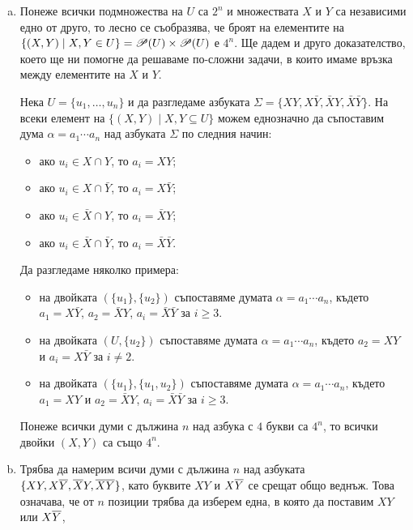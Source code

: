\begin{hint}
  \begin{enumerate}[a)]
  \item
    Понеже всички подмножества на $U$ са $2^n$ и множествата $X$ и $Y$ са независими едно от друго, то
    лесно се съобразява, че броят на елементите на $\{(X,Y) \mid X,Y \in U\} = \mathscr{P}(U) \times \mathscr{P}(U)$ е $4^n$.
    Ще дадем и друго доказателство, което ще ни помогне да решаваме по-сложни задачи, в които имаме връзка между 
    елементите на $X$ и $Y$.
    
    Нека $U = \{u_1,\dots,u_n\}$ и да разгледаме азбуката $\Sigma = \{XY, X\bar{Y}, \bar{X}Y, \bar{X}\bar{Y}\}$.
    На всеки елемент на  $\{(X,Y) \mid X,Y \subseteq U\}$ можем еднозначно да съпоставим 
    дума  $\alpha = a_1\cdots a_n$ над азбуката $\Sigma$
    по следния начин:
    \begin{itemize}
    \item 
      ако $u_i \in X \cap Y$, то $a_i = XY$;
    \item 
      ако $u_i \in X \cap \bar{Y}$, то $a_i = X\bar{Y}$;
    \item 
      ако $u_i \in \bar{X} \cap Y$, то $a_i = \bar{X}Y$;
    \item 
      ако $u_i \in \bar{X} \cap \bar{Y}$, то $a_i = \bar{X}\bar{Y}$.
    \end{itemize}
    Да разгледаме няколко примера:
    \begin{itemize}
    \item
      на двойката $(\{u_1\},\{u_2\})$ съпоставяме думата $\alpha = a_1\cdots a_n$,
      където $a_1 = X\bar{Y}$, $a_2 = \bar{X}Y$, $a_i = \bar{X}\bar{Y}$ за $i \geq 3$.
    \item 
      на двойката $(U,\{u_2\})$ съпоставяме думата $\alpha = a_1\cdots a_n$,
      където $a_2 = XY$ и $a_i = X\bar{Y}$ за $i \neq 2$.
    \item
      на двойката $(\{u_1\},\{u_1,u_2\})$ съпоставяме думата $\alpha = a_1\cdots a_n$,
      където $a_1 = XY$ и $a_2 = \bar{X}Y$, $a_i = \bar{X}\bar{Y}$ за $i \geq 3$.
    \end{itemize}
    Понеже всички думи с дължина $n$ над азбука с $4$ букви са $4^n$, 
    то всички двойки $(X,Y)$ са също $4^n$.
  \item
    Трябва да намерим всичи думи с дължина $n$ над азбуката $\{XY,X\overline{Y},\overline{X}Y,\overline{X}\overline{Y}\}$,
    като буквите $XY$ и $X\overline{Y}$ се срещат общо веднъж.
    Това означава, че от $n$ позиции трябва да изберем една, в която да поставим $XY$ или $X\overline{Y}$,

\end{enumerate}
\end{hint}
